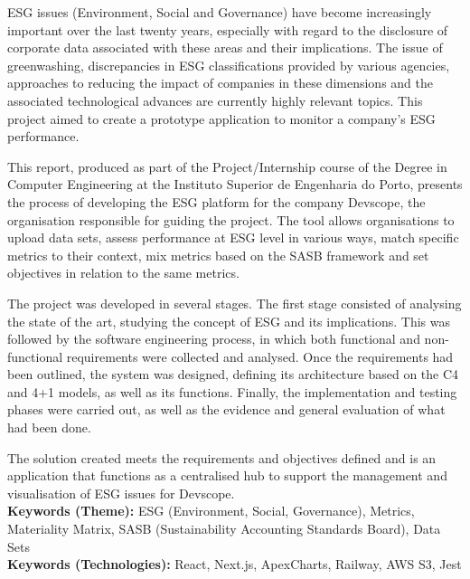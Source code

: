 \begin{abstractotherlanguage}

ESG issues (Environment, Social and Governance) have become increasingly important over the last twenty years, especially with regard to the disclosure of corporate data associated with these areas and their implications. The issue of greenwashing, discrepancies in ESG classifications provided by various agencies, approaches to reducing the impact of companies in these dimensions and the associated technological advances are currently highly relevant topics. This project aimed to create a prototype application to monitor a company's ESG performance.

This report, produced as part of the Project/Internship course of the Degree in Computer Engineering at the Instituto Superior de Engenharia do Porto, presents the process of developing the ESG platform for the company Devscope, the organisation responsible for guiding the project. The tool allows organisations to upload data sets, assess performance at ESG level in various ways, match specific metrics to their context, mix metrics based on the SASB framework and set objectives in relation to the same metrics.

The project was developed in several stages. The first stage consisted of analysing the state of the art, studying the concept of ESG and its implications. This was followed by the software engineering process, in which both functional and non-functional requirements were collected and analysed. Once the requirements had been outlined, the system was designed, defining its architecture based on the C4 and 4+1 models, as well as its functions. Finally, the implementation and testing phases were carried out, as well as the evidence and general evaluation of what had been done.

The solution created meets the requirements and objectives defined and is an application that functions as a centralised hub to support the management and visualisation of ESG issues for Devscope. \\

\textbf{Keywords (Theme):}	ESG (Environment, Social, Governance), Metrics, Materiality Matrix, SASB (Sustainability Accounting Standards Board), Data Sets \\

\textbf{Keywords (Technologies):} React, Next.js, ApexCharts, Railway, AWS S3, Jest

\end{abstractotherlanguage}

